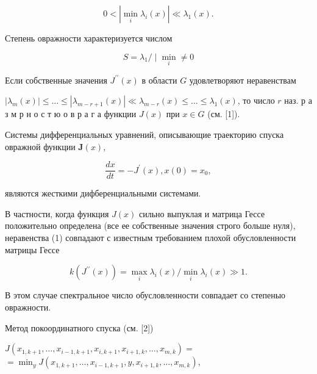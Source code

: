 \documentclass[10pt]{article}
\begin{document}
\[

0<\left|\min _{i} \lambda_{i}(x)\right| \ll \lambda_{1}(x) .

\]



Степень овражности характеризуется числом



\[

S=\lambda_{1} / \mid \min _{i} \neq 0

\]



Если собственные значения $J^{\prime \prime}(x)$ в области $G$ удовлетворяют неравенствам



$\left|\lambda_{m}(x)\right| \leqslant \ldots \leqslant\left|\lambda_{m-r+1}(x)\right| \ll \lambda_{m-r}(x) \leqslant \ldots \leqslant \lambda_{1}(x)$, то число $r$ наз. р а з м р н о с т ю о в р а г а функции $J(x)$ при $x \in G$ (см. [1]).



Системы дифференциальных уравнений, описывающие траекторию спуска овражной функции $\boldsymbol{J}(x)$,



\[

\frac{d x}{d t}=-J^{\prime}(x), x(0)=x_{0},

\]



являются жесткими дифберенциальными системами.



В частности, когда функция $J(x)$ сильно выпуклая и матрица Гессе положительно определена (все ее собственные значения строго больше нуля), неравенства (1) совпадают с известным требованием плохой обусловленности матрицы Гессе



\[

k\left(J^{\prime \prime}(x)\right)=\max _{i} \lambda_{i}(x) / \min _{i} \lambda_{i}(x) \gg 1 .

\]



В этом случае спектральное число обусловленности совпадает со степеныо овражности.



Метод покоординатного спуска (см. [2])



$J\left(x_{1, k+1}, \ldots, x_{i-1, k+1}, x_{i, k+1}, x_{i+1, k}, \ldots, x_{m, k}\right)=$ $=\min _{y} J\left(x_{1, k+1}, \ldots, x_{i-1, k+1}, y, x_{i+1, k}, \ldots, x_{m, k}\right)$,
\end{document}
